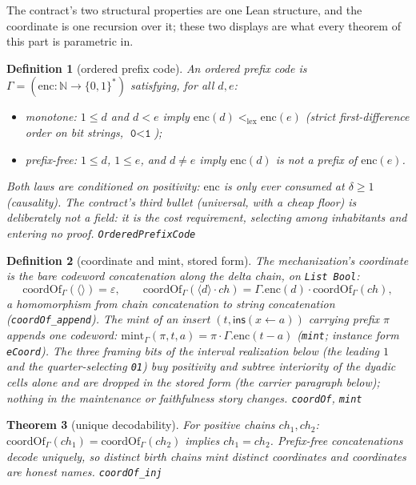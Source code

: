 \documentclass[11pt]{article}
\newtheorem{theorem}{Theorem}[section]
\newtheorem{definition}[theorem]{Definition}
\newcommand{\lean}[1]{\texttt{#1}}
\newcommand{\code}[1]{\texttt{#1}}
\newcommand{\ins}{\mathsf{ins}}
\begin{document}
The contract's two structural properties are one Lean structure, and
the coordinate is one recursion over it; these two displays are what
every theorem of this part is parametric in.

\begin{definition}[ordered prefix code]
\label{def:opc}
An \emph{ordered prefix code} is $\Gamma = (\mathrm{enc} : \mathbb{N}
\to \{0,1\}^{*})$ satisfying, for all $d, e$:
\begin{itemize}[leftmargin=2em]
\item[(m)] \emph{monotone}: $1 \le d$ and $d < e$ imply
  $\mathrm{enc}(d) <_{\mathrm{lex}} \mathrm{enc}(e)$ (strict
  first-difference order on bit strings, $\code{0} < \code{1}$);
\item[(p)] \emph{prefix-free}: $1 \le d$, $1 \le e$, and $d \ne e$
  imply $\mathrm{enc}(d)$ is not a prefix of $\mathrm{enc}(e)$.
\end{itemize}
Both laws are conditioned on positivity: $\mathrm{enc}$ is only ever
consumed at $\delta \ge 1$ (causality). The contract's third bullet
(universal, with a cheap floor) is deliberately \emph{not} a field:
it is the cost requirement, selecting among inhabitants and entering
no proof.
\hfill\lean{OrderedPrefixCode}
\end{definition}

\begin{definition}[coordinate and mint, stored form]
\label{def:coordmint}
The mechanization's coordinate is the bare codeword concatenation
along the delta chain, on \code{List Bool}:
\[
  \mathrm{coordOf}_\Gamma(\langle\rangle) = \varepsilon,
  \qquad
  \mathrm{coordOf}_\Gamma(\langle d \rangle \cdot ch)
  = \Gamma.\mathrm{enc}(d) \cdot \mathrm{coordOf}_\Gamma(ch),
\]
a homomorphism from chain concatenation to string concatenation
(\lean{coordOf\_append}). The \emph{mint} of an insert $(t, \ins(x
\leftarrow a))$ carrying prefix $\pi$ appends one codeword:
$\mathrm{mint}_\Gamma(\pi, t, a) = \pi \cdot \Gamma.\mathrm{enc}(t -
a)$ (\lean{mint}; instance form \lean{eCoord}). The three framing
bits of the interval realization below (the leading $1$ and the
quarter-selecting \code{01}) buy positivity and subtree interiority
of the dyadic cells alone and are dropped in the stored form (the
carrier paragraph below); nothing in the maintenance or faithfulness
story changes.
\hfill\lean{coordOf}, \lean{mint}
\end{definition}

\begin{theorem}[unique decodability]
\label{thm:uniquedecode}
For positive chains $ch_1, ch_2$: $\mathrm{coordOf}_\Gamma(ch_1) =
\mathrm{coordOf}_\Gamma(ch_2)$ implies $ch_1 = ch_2$. Prefix-free
concatenations decode uniquely, so distinct birth chains mint
distinct coordinates and coordinates are honest names.
\hfill\lean{coordOf\_inj}
\end{theorem}
\end{document}
